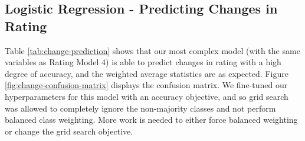\documentclass{article}[11pt]
\begin{document}


    \clearpage
    \newpage

    \subsection{Logistic Regression - Predicting Changes in Rating}

    \label{sec:change-prediction}

    Table \ref{tab:change-prediction} shows that our most complex model (with the same variables as Rating Model 4) is able to predict changes in rating with a high degree of accuracy, and the weighted average statistics are as expected. Figure \ref{fig:change-confusion-matrix} displays the confusion matrix. We fine-tuned our hyperparameters for this model with an accuracy objective, and so grid search was allowed to completely ignore the non-majority classes and not perform balanced class weighting. More work is needed to either force balanced weighting or change the grid search objective.


\end{document}
